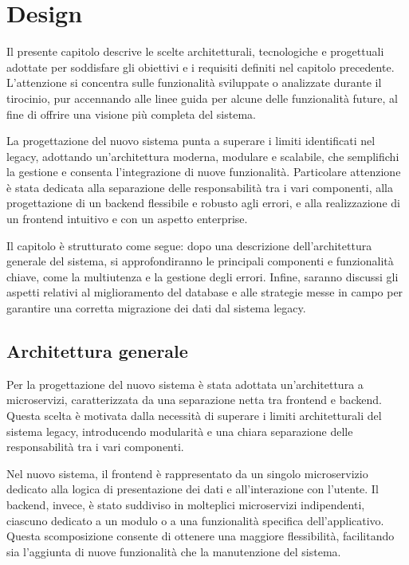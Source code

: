 \chapter{Design}

Il presente capitolo descrive le scelte architetturali, tecnologiche e progettuali adottate per soddisfare gli obiettivi e i requisiti definiti nel capitolo precedente. L'attenzione si concentra sulle funzionalità sviluppate o analizzate durante il tirocinio, pur accennando alle linee guida per alcune delle funzionalità future, al fine di offrire una visione più completa del sistema.

La progettazione del nuovo sistema punta a superare i limiti identificati nel legacy, adottando un'architettura moderna, modulare e scalabile, che semplifichi la gestione e consenta l'integrazione di nuove funzionalità. Particolare attenzione è stata dedicata alla separazione delle responsabilità tra i vari componenti, alla progettazione di un backend flessibile e robusto agli errori, e alla realizzazione di un frontend intuitivo e con un aspetto enterprise.

Il capitolo è strutturato come segue: dopo una descrizione dell’architettura generale del sistema, si approfondiranno le principali componenti e funzionalità chiave, come la multiutenza e la gestione degli errori. Infine, saranno discussi gli aspetti relativi al miglioramento del database e alle strategie messe in campo per garantire una corretta migrazione dei dati dal sistema legacy.

\section{Architettura generale}
Per la progettazione del nuovo sistema è stata adottata un'architettura a microservizi, caratterizzata da una separazione netta tra frontend e backend. Questa scelta è motivata dalla necessità di superare i limiti architetturali del sistema legacy, introducendo modularità e una chiara separazione delle responsabilità tra i vari componenti.

Nel nuovo sistema, il frontend è rappresentato da un singolo microservizio dedicato alla logica di presentazione dei dati e all'interazione con l'utente. Il backend, invece, è stato suddiviso in molteplici microservizi indipendenti, ciascuno dedicato a un modulo o a una funzionalità specifica dell'applicativo. Questa scomposizione consente di ottenere una maggiore flessibilità, facilitando sia l'aggiunta di nuove funzionalità che la manutenzione del sistema.

